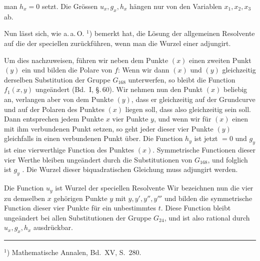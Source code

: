 
man $h_x = 0$ setzt. Die Gr\"ossen $u_x, g_x, h_x$ h\"angen nur von den
Variablen $x_1, x_2, x_3$ ab.

Nun l\"asst sich, wie  a.\,a.\,O. ${}^1$) bemerkt hat, die L\"osung
der allgemeinen Resolvente auf die der speciellen zur\"uckf\"uhren,
wenn man die Wurzel einer 
adjungirt.

Um dies nachzuweisen, f\"uhren wir neben dem Punkte $(x)$
einen zweiten Punkt $(y)$ ein und bilden die Polare von $f$:
Wenn wir dann $(x)$ und $(y)$ gleichzeitig derselben Substitu\-tion
der Gruppe $G_{168}$ unterwerfen, so bleibt die Function $f_1(x,y)$
unge\"andert (Bd.\ I, \S.\,60). Wir nehmen nun den Punkt $(x)$ beliebig
 an, verlangen aber von dem Punkte $(y)$, dass er gleichzeitig
 auf der Grundcurve und auf der Polaren des Punktes $(x)$
liegen soll, dass also gleichzeitig
sein soll. Dann entsprechen jedem Punkte $x$ vier Punkte $y$, und
wenn wir f\"ur $(x)$ einen mit ihm verbundenen Punkt setzen, so
geht jeder dieser vier Punkte $(y)$ gleichfalls in einen verbundenen
Punkt \"uber. Die Function $h_y$ ist jetzt $=0$ und $g_y$ ist eine vierwerthige
 Function des Punktes $(x)$. Symmetrische Functionen
dieser vier Werthe bleiben unge\"andert durch die Substitutionen
von $G_{168}$, und folglich ist $g_y$ . Die Wurzel dieser biquadratischen Gleichung muss
adjungirt werden.

Die Function $u_y$ ist Wurzel der speciellen Resolvente
Wir bezeichnen nun die vier zu demselben $x$ geh\"origen Punkte
$y$ mit $y, y', y'', y'''$ und bilden die symmetrische Function dieser
vier Punkte
f\"ur ein unbestimmtes $t$. Diese Function bleibt unge\"andert bei
allen Substitutionen der Gruppe $G_{24}$, und ist also rational durch
$u_x, g_x, h_x$ ausdr\"uckbar.

\par\noindent\rule{0.3\linewidth}{0.4pt}\par
${}^1$) Mathematische Annalen, Bd.\ XV, S.\ 280.
